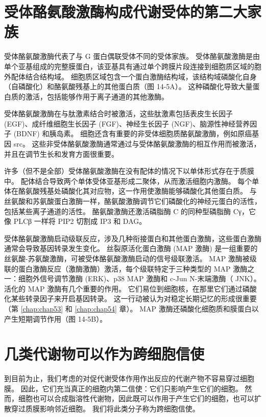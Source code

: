 \section{受体酪氨酸激酶构成代谢受体的第二大家族}

受体酪氨酸激酶代表了与 G 蛋白偶联受体不同的受体家族。
受体酪氨酸激酶是由单个亚基组成的完整膜蛋白，该亚基具有通过单个跨膜片段连接到细胞质区域的胞外配体结合结构域。
细胞质区域包含一个蛋白激酶结构域，该结构域磷酸化自身（自磷酸化）和酪氨酸残基上的其他蛋白质（图 14-5A）。
这种磷酸化导致大量蛋白质的激活，包括能够作用于离子通道的其他激酶。


受体酪氨酸激酶在与肽激素结合时被激活，这些肽激素包括表皮生长因子 (EGF)、成纤维细胞生长因子 (FGF)、神经生长因子 (NGF)、脑源性神经营养因子 (BDNF) 和胰岛素。
细胞还含有重要的非受体细胞质酪氨酸激酶，例如原癌基因 src。
这些非受体酪氨酸激酶通常通过与受体酪氨酸激酶的相互作用而被激活，并且在调节生长和发育方面很重要。


许多（但不是全部）受体酪氨酸激酶在没有配体的情况下以单体形式存在于质膜中。
配体结合导致两个单体受体亚基形成二聚体，从而激活细胞内激酶。
每个单体在酪氨酸残基处磷酸化其对应物，这一作用使激酶能够磷酸化其他蛋白质。
与丝氨酸和苏氨酸蛋白激酶一样，酪氨酸激酶调节它们磷酸化的神经元蛋白的活性，包括某些离子通道的活性。 
酪氨酸激酶还激活磷脂酶 C 的同种型磷脂酶 Cγ，它像 PLCβ 一样将 PIP2 切割成 IP3 和 DAG。


受体酪氨酸激酶启动级联反应，涉及几种衔接蛋白和其他蛋白激酶，这些蛋白激酶通常会导致基因转录发生变化。 丝裂原活化蛋白激酶 (MAP 激酶) 是一组重要的丝氨酸-苏氨酸激酶，可被受体酪氨酸激酶启动的信号级联激活。
MAP 激酶被级联的蛋白激酶反应（激酶激酶）激活，每个级联特定于三种类型的 MAP 激酶之一：细胞外信号调节激酶 (ERK)、p38 MAP 激酶和 c-Jun N-末端激酶（ JNK）。
活化的 MAP 激酶有几个重要的作用。
它们易位到细胞核，在那里它们通过磷酸化某些转录因子来开启基因转录。
这一行动被认为对稳定长期记忆的形成很重要（第 \ref{chap:chap53} 和 \ref{chap:chap54} 章）。 
MAP 激酶还磷酸化细胞质和膜蛋白以产生短期调节作用（图 14-5B）。


\section{几类代谢物可以作为跨细胞信使}

到目前为止，我们考虑的对促代谢受体作用作出反应的代谢产物不容易穿过细胞膜。 
因此，它们充当真正的细胞内第二信使：它们只影响产生它们的细胞。
然而，细胞也可以合成脂溶性代谢物，因此既可以作用于产生它们的细胞，也可以扩散穿过质膜影响邻近细胞。 
我们将此类分子称为跨细胞信使。


